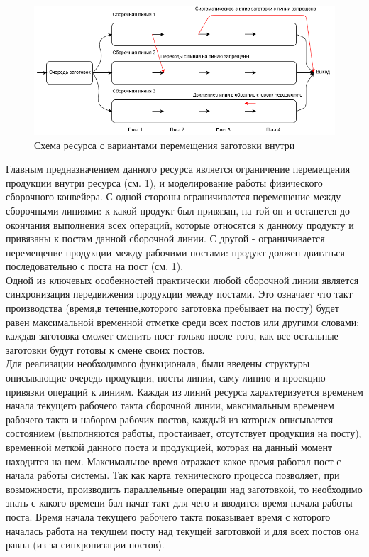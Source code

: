 \begin{figure}[h]
	\includegraphics[width=\linewidth]{pics/assemblyMain.png}
	\caption{Схема ресурса с вариантами перемещения заготовки внутри}
	\label{fig:assemblyMain}
\end{figure}

\indent Главным предназначением данного ресурса является ограничение перемещения продукции внутри ресурса (см. \ref{fig:assemblyMain}), и моделирование работы физического сборочного конвейера.
С одной стороны ограничивается перемещение между сборочными линиями: к какой продукт был привязан, на той он и останется до окончания выполнения всех операций, которые относятся к данному продукту и привязаны к постам данной сборочной линии.
С другой - ограничивается перемещение продукции между рабочими постами: продукт должен двигаться последовательно с поста на пост (см. \ref{fig:assemblyMain}).\\
\indent Одной из ключевых особенностей практически любой сборочной линии является синхронизация передвижения продукции между постами. 
Это означает что такт производства (время,в течение,которого заготовка пребывает на посту) будет равен максимальной временной отметке среди всех постов или другими словами: каждая заготовка сможет сменить пост только после того, как все остальные заготовки будут готовы к смене своих постов.\\
\indent Для реализации необходимого функционала, были введены структуры описывающие очередь продукции, посты линии, саму линию и проекцию привязки операций к линиям.
Каждая из линий ресурса характеризуется временем начала текущего рабочего такта сборочной линии, максимальным временем рабочего такта и набором рабочих постов, каждый из которых описывается состоянием (выполняются работы, простаивает, отсутствует продукция на посту), временной меткой данного поста и продукцией, которая на данный момент находится на нем.
Максимальное время отражает какое время работал пост с начала работы системы.
Так как карта технического процесса позволяет, при возможности, производить параллельные операции над заготовкой, то необходимо знать с какого времени бал начат такт для чего и вводится время начала работы поста.
Время начала текущего рабочего такта показывает время с которого началась работа на текущем посту над текущей заготовкой и для всех постов она равна (из-за синхронизации постов).

